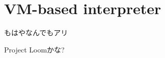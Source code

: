 \section{VM-based interpreter}
\begin{frame}
  \frametitlesec

  もはやなんでもアリ

  Project Loomかな?
\end{frame}
